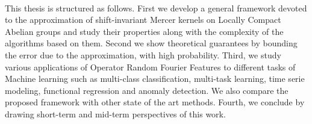 \paragraph{}
This thesis is structured as follows. First we develop a general framework devoted to the approximation of shift-invariant Mercer kernels on Locally Compact Abelian groups and study their properties along with the complexity of the algorithms based on them. Second we show theoretical guarantees by bounding the error due to the approximation, with high probability. Third, we study various applications of Operator Random Fourier Features to different tasks of Machine learning such as multi-class classification, multi-task learning, time serie modeling, functional regression and anomaly detection. We also compare the proposed framework with other state of the art methods. Fourth, we conclude by drawing short-term and mid-term perspectives of this work.

\endgroup

\vfill
